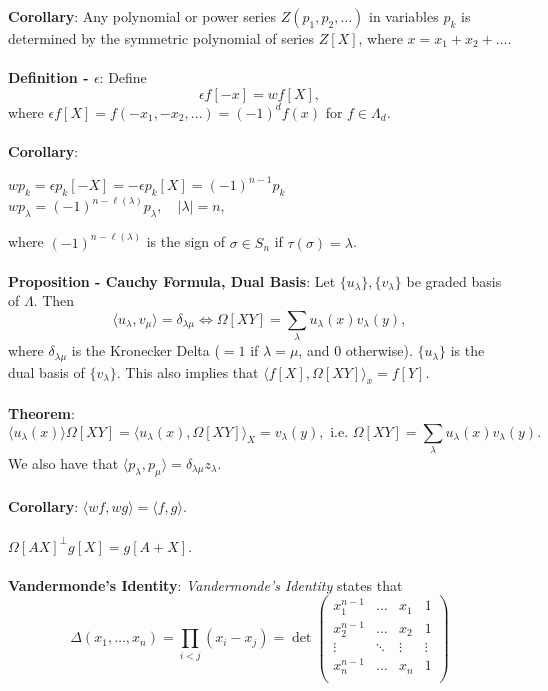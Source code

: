 \documentclass{article}
\begin{document}
\textbf{Corollary}: Any polynomial or power series $Z(p_1, p_2, \dots)$ in variables $p_k$ is determined by the symmetric polynomial of series $Z[X]$, where $x = x_1 + x_2 + \dots$. \\ \\
\textbf{Definition - $\epsilon$}: Define $$\epsilon f[-x] = wf[X],$$ where $\epsilon f[X] = f(-x_1, -x_2, \dots) = (-1)^d f(x)$ for $f \in \Lambda_d$. \\ \\
\textbf{Corollary}: \begin{center}
    $wp_k = \epsilon p_k[-X] = -\epsilon p_k[X] = (-1)^{n - 1} p_k$ \\
    $wp_\lambda = (-1)^{n - \ell(\lambda)} p_\lambda, \quad |\lambda| = n$,
\end{center} where $(-1)^{n - \ell(\lambda)}$ is the sign of $\sigma \in S_n$ if $\tau(\sigma) = \lambda$. \\ \\
\textbf{Proposition - Cauchy Formula, Dual Basis}: Let $\{u_\lambda\}, \{v_\lambda\}$ be graded basis of $\Lambda$. Then $$\langle u_\lambda, v_\mu \rangle = \delta_{\lambda \mu} \iff \Omega[XY] = \sum_\lambda u_\lambda(x) v_\lambda(y),$$ where $\delta_{\lambda \mu}$ is the Kronecker Delta ($= 1$ if $\lambda = \mu$, and 0 otherwise). $\{u_\lambda\}$ is the dual basis of $ \{v_\lambda\}$. This also implies that $\langle f[X], \Omega[XY] \rangle_x = f[Y]$. \\ \\
\textbf{Theorem}: $$\langle u_\lambda(x) \rangle \Omega[XY] = \langle u_\lambda(x), \Omega[XY] \rangle_X = v_\lambda(y), \text{ i.e. } \Omega[XY] = \sum_\lambda u_\lambda(x) v_\lambda(y).$$ We also have that $\langle p_\lambda, p_\mu \rangle = \delta_{\lambda \mu} z_\lambda$. \\ \\
\textbf{Corollary}: $\langle wf, wg \rangle = \langle f, g \rangle$. \\ \\
$\Omega[AX]^\perp g[X] = g[A + X]$. \\ \\
\textbf{Vandermonde's Identity}: \textit{Vandermonde's Identity} states that $$\Delta (x_1, \dots, x_n) = \prod_{i < j} (x_i - x_j) = \det \begin{pmatrix}
    x_1^{n - 1} & \dots & x_1 & 1 \\
    x_2^{n - 1} & \dots & x_2 & 1 \\
    \vdots & \ddots & \vdots & \vdots \\
    x_n^{n - 1} & \dots & x_n & 1 \\
\end{pmatrix}$$ \\
\end{document}
